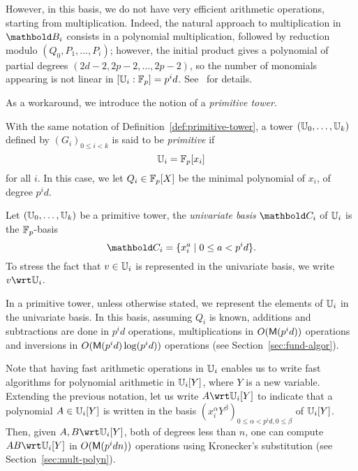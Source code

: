 However, in this basis, we do not have very efficient arithmetic
operations, starting from multiplication. Indeed, the natural approach
to multiplication in $\basis{B}_i$ consists in a polynomial multiplication,
followed by reduction modulo $(Q_0,P_1,\dots,P_i)$; however, the
initial product gives a polynomial of partial degrees
$(2d-2,2p-2,\dots,2p-2)$, so the number of monomials appearing is not
linear in $[\mathbb{U}_i:\mathbb{F}_p]=p^id$.  See~\cite{li+moreno+schost07} for
details.

As a workaround, we introduce the notion of a {\em primitive tower}.

\begin{definition}
  With the same notation of Definition~\ref{def:primitive-tower}, a
  tower $(\mathbb{U}_0,\ldots,\mathbb{U}_k)$ defined by $(G_i)_{0 \le i < k}$ is said
  to be \emph{primitive} if
  \begin{equation}
    \label{eq:59}
    \mathbb{U}_i = \mathbb{F}_p[x_i]
  \end{equation}
  for all $i$. In this case, we let $Q_i\in \mathbb{F}_p[X]$ be the minimal
  polynomial of $x_i$, of degree $p^id$.
\end{definition}

\begin{definition}
  Let $(\mathbb{U}_0,\ldots,\mathbb{U}_k)$ be a primitive tower, the \emph{univariate
    basis} $\basis{C}_i$ of $\mathbb{U}_i$ is the $\mathbb{F}_p$-basis
  \begin{equation}
    \pdfmctwo{Explicit indices for the basis.}
    \basis{C}_i=\{x_i^a \;|\; 0\le a<p^id\}
    \text{.}  
  \end{equation}
  To stress the fact that $v\in\mathbb{U}_i$ is represented in the univariate
  basis, we write $v\wrt\U_i$.
\end{definition}

In a primitive tower, unless otherwise stated, we represent the
elements of $\mathbb{U}_i$ in the univariate basis. In this basis, assuming
$Q_i$ is known, additions and subtractions are done in $p^id$
operations, multiplications in $O(\mathsf{M}(p^id))$ operations and
inversions in $O(\mathsf{M}(p^id)\log(p^id))$ operations (see
Section~\ref{sec:fund-algor}).

Note that having fast arithmetic operations in $\mathbb{U}_i$ enables us to
write fast algorithms for polynomial arithmetic in $\mathbb{U}_i[Y]$, where
$Y$ is a new variable. Extending the previous notation, let us write
$A \wrt\U_i[Y]$ to indicate that a polynomial $A \in \mathbb{U}_i[Y]$ is
written in the basis $(x_i^\alpha Y^\beta)_{0 \le \alpha < p^id, 0 \le
  \beta}$ of $\mathbb{U}_i[Y]$.  Then, given $A,B \wrt \U_i[Y]$, both of
degrees less than $n$, one can compute $AB \wrt \U_i[Y]$ in
$O(\mathsf{M}(p^id n))$ operations using Kronecker's substitution (see
Section~\ref{sec:mult-polyn}).


